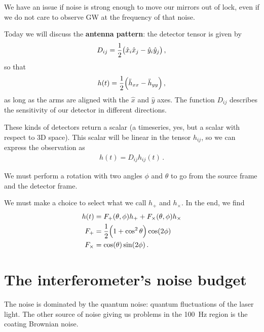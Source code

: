 \documentclass[main.tex]{subfiles}
\begin{document}

We have an issue if noise is strong enough to move our mirrors out of lock, even if we do not care to observe GW at the frequency of that noise.

Today we will discuss the \textbf{antenna pattern}: the detector tensor is given by 
%
\begin{align}
D_{ij} = \frac{1}{2} \qty(\hat{x}_{i} \hat{x}_{j} - \hat{y}_{i} \hat{y}_{j}) 
\,,
\end{align}
%
so that 
%
\begin{align}
h(t) = \frac{1}{2} \qty(\ddot{h}_{xx} - \ddot{h}_{yy})
\,,
\end{align}
%
as long as the arms are aligned with the \(\hat{x}\) and \(\hat{y}\) axes. 
The function \(D_{ij}\) describes the sensitivity of our detector in different directions. 

These kinds of detectors return a scalar (a timeseries, yes, but a scalar with respect to 3D space). This scalar will be linear in the tensor \(h_{ij}\), so we can express the observation as 
%
\begin{align}
h(t) = D_{ij} h_{ij} (t)
\,.
\end{align}

We must perform a rotation with two angles \(\phi \) and \(\theta \) to go from the source frame and the detector frame. 

We must make a choice to select what we call \(h_{+}\) and \(h_{ \times }\). In the end, we find 
%
\begin{subequations}
\begin{align}
h(t) &= F_{+} (\theta , \phi ) h_{+}+ F_{\times} (\theta , \phi ) h_{\times}  \\
F_{+} &= \frac{1}{2} \qty(1 + \cos^2\theta ) \cos( 2 \phi )  \\
F_{ \times } &= \cos(\theta ) \sin(2 \phi )
\,.
\end{align}
\end{subequations}

\section{The interferometer's noise budget}

The noise is dominated by the quantum noise: quantum fluctuations of the laser light. 
The other source of noise giving us problems in the \SI{100}{Hz} region is the coating Brownian noise. 
\end{document}
